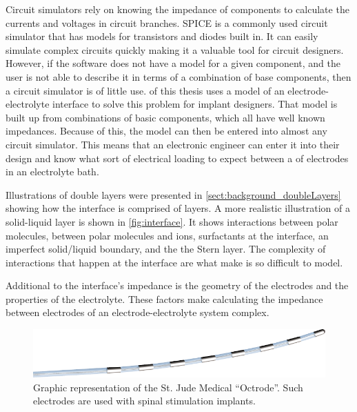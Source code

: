   Circuit simulators rely on knowing the impedance of components to calculate the currents and voltages in circuit branches.
  SPICE is a commonly used circuit simulator that has models for transistors and diodes built in.
  It can easily simulate complex circuits quickly making it a valuable tool for circuit designers.
  However, if the software does not have a model for a given component, and the user is not able to describe it in terms of a combination of base components, then a circuit simulator is of little use.
   of this thesis uses a model of an electrode-electrolyte interface to solve this problem for implant designers.
  That model is built up from combinations of basic components, which all have well known impedances.
  Because of this, the model can then be entered into almost any circuit simulator.
  This means that an electronic engineer can enter it into their design and know what sort of electrical loading to expect between a of electrodes in an electrolyte bath.
  
  Illustrations of double layers were presented in \cref{sect:background_doubleLayers} showing how the interface is comprised of layers.
  A more realistic illustration of a solid-liquid layer is shown in \cref{fig:interface}.
  It shows interactions between polar molecules, between polar molecules and ions, surfactants at the interface, an imperfect solid/liquid boundary, and the the Stern layer.
  The complexity of interactions that happen at the interface are what make is so difficult to model.


  Additional to the interface's impedance is the geometry of the electrodes and the properties of the electrolyte.
  These factors make calculating the impedance between electrodes of an electrode-electrolyte system complex.

  \begin{figure}
    \begin{center}
      \includegraphics{content/introduction/graphics/StJudeOctrode}
    \end{center}
    \caption{Graphic representation of the St. Jude Medical ``Octrode''. Such electrodes are used with spinal stimulation implants.}
    \label{fig:octrode}
  \end{figure}

